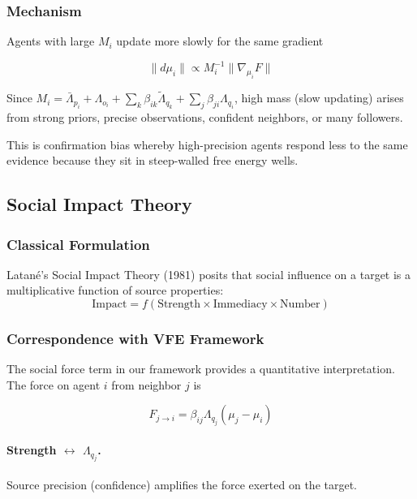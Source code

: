 \documentclass[12pt]{article}
\begin{document}
\subsubsection{Mechanism}

Agents with large $M_i$ update more slowly for the same gradient

\begin{equation}
\|d\mu_i\| \propto M_i^{-1} \|\nabla_{\mu_i} F\|
\end{equation}

Since $M_i = \bar{\Lambda}_{p_i} + \Lambda_{o_i} + \sum_k\beta_{ik}\tilde{\Lambda}_{q_k} + \sum_j\beta_{ji}\Lambda_{q_i}$, high mass (slow updating) arises from strong priors, precise observations, confident neighbors, or many followers.

This is confirmation bias whereby high-precision agents respond 
less to the same evidence because they sit in steep-walled free energy wells.

\subsection{Social Impact Theory}

\subsubsection{Classical Formulation}

Latané's Social Impact Theory (1981) posits that social influence on a target 
is a multiplicative function of source properties:
\begin{equation}
\text{Impact} = f(\text{Strength} \times \text{Immediacy} \times \text{Number})
\end{equation}

\subsubsection{Correspondence with VFE Framework}

The social force term in our framework provides a quantitative interpretation. 
The force on agent $i$ from neighbor $j$ is

\begin{equation}
F_{j \to i} = \beta_{ij} \Lambda_{q_j} (\mu_j - \mu_i)
\end{equation}

\paragraph{Strength $\leftrightarrow$ $\Lambda_{q_j}$.} Source precision (confidence) amplifies the force exerted on the target.
\end{document}
